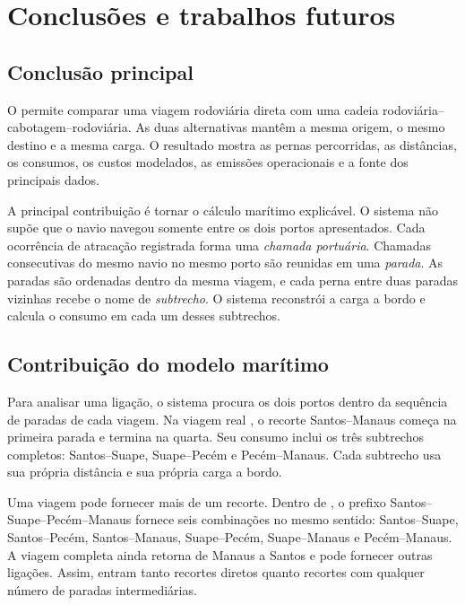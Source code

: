 \chapter{Conclusões e trabalhos futuros}
\label{ch:conclusoes}

\section{Conclusão principal}
\label{sec:conclusao-principal}

O \CabotageLens{} permite comparar uma viagem rodoviária direta com uma cadeia rodoviária--cabotagem--rodoviária. As duas alternativas mantêm a mesma origem, o mesmo destino e a mesma carga. O resultado mostra as pernas percorridas, as distâncias, os consumos, os custos modelados, as emissões operacionais e a fonte dos principais dados.

A principal contribuição é tornar o cálculo marítimo explicável. O sistema não supõe que o navio navegou somente entre os dois portos apresentados. Cada ocorrência de atracação registrada forma uma \emph{chamada portuária}. Chamadas consecutivas do mesmo navio no mesmo porto são reunidas em uma \emph{parada}. As paradas são ordenadas dentro da mesma viagem, e cada perna entre duas paradas vizinhas recebe o nome de \emph{subtrecho}. O sistema reconstrói a carga a bordo e calcula o consumo em cada um desses subtrechos.

\section{Contribuição do modelo marítimo}
\label{sec:contribuicao-conclusao}

Para analisar uma ligação, o sistema procura os dois portos dentro da sequência de paradas de cada viagem. Na viagem real , o recorte Santos--Manaus começa na primeira parada e termina na quarta. Seu consumo inclui os três subtrechos completos: Santos--Suape, Suape--Pecém e Pecém--Manaus. Cada subtrecho usa sua própria distância e sua própria carga a bordo.

Uma viagem pode fornecer mais de um recorte. Dentro de , o prefixo Santos--Suape--Pecém--Manaus fornece seis combinações no mesmo sentido: Santos--Suape, Santos--Pecém, Santos--Manaus, Suape--Pecém, Suape--Manaus e Pecém--Manaus. A viagem completa ainda retorna de Manaus a Santos e pode fornecer outras ligações. Assim, entram tanto recortes diretos quanto recortes com qualquer número de paradas intermediárias.

